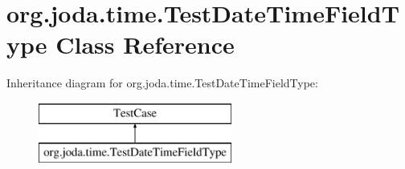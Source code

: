 \hypertarget{classorg_1_1joda_1_1time_1_1_test_date_time_field_type}{\section{org.\-joda.\-time.\-Test\-Date\-Time\-Field\-Type Class Reference}
\label{classorg_1_1joda_1_1time_1_1_test_date_time_field_type}
}
Inheritance diagram for org.\-joda.\-time.\-Test\-Date\-Time\-Field\-Type\-:\begin{figure}[H]
\begin{center}
\leavevmode
\includegraphics[height=2.000000cm]{classorg_1_1joda_1_1time_1_1_test_date_time_field_type}
\end{center}
\end{figure}
